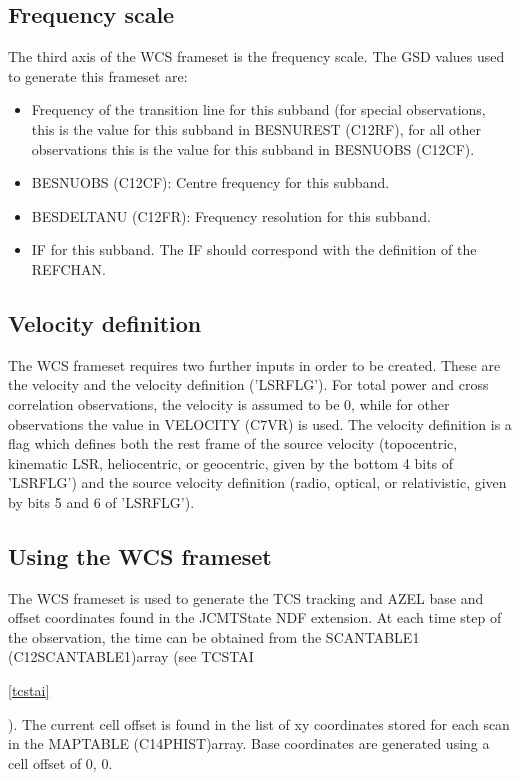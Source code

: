 \documentclass[twoside,11pt]{article}
\newcommand{\xlabel}[1]{}
\renewcommand{\_}{\texttt{\symbol{95}}}
\newcommand{\velocity}{VELOCITY (C7VR)}
\newcommand{\scanTableA}{SCAN\_TABLE1 (C12SCAN\_TABLE\_1)}
\newcommand{\mapTable}{MAP\_TABLE (C14PHIST)}
\newcommand{\centreFreqs}{BES\_NUOBS (C12CF)}
\newcommand{\restFreqs}{BES\_NUREST (C12RF)}
\newcommand{\freqRes}{BES\_DELTANU (C12FR)}
\newcommand{\velocity}{VELOCITY (C7VR)\ref{GSDVars:velocity}}
\newcommand{\scanTableA}{SCAN\_TABLE1 (C12SCAN\_TABLE\_1)\ref{GSDVars:scanTableA}}
\newcommand{\mapTable}{MAP\_TABLE (C14PHIST)\ref{GSDVars:mapTable}}
\newcommand{\centreFreqs}{BES\_NUOBS (C12CF)\ref{GSDVars:centreFreqs}}
\newcommand{\restFreqs}{BES\_NUREST (C12RF)\ref{GSDVars:restFreqs}}
\newcommand{\freqRes}{BES\_DELTANU (C12FR)\ref{GSDVars:freqRes}}
\begin{document}
\subsection{\xlabel{WCS_FREQUENCY}Frequency scale}

The third axis of the WCS frameset is the frequency scale.  The GSD values used to generate this frameset are:

\begin{itemize}
\item Frequency of the transition line for this subband (for special observations, this is the value for this subband in \restFreqs{}, for all other observations this is the value for this subband in \centreFreqs{}.
\item \centreFreqs{}: Centre frequency for this subband.
\item \freqRes{}: Frequency resolution for this subband.
\item IF for this subband.  The IF should correspond with the definition of the REFCHAN.
\end{itemize}

\subsection{\xlabel{WCS_VELOCITY}Velocity definition}

The WCS frameset requires two further inputs in order to be created.  These are the velocity and the velocity definition ('LSRFLG').  For total power and cross correlation observations, the velocity is assumed to be 0, while for other observations the value in \velocity{} is used.  The velocity definition is a flag which defines both the rest frame of the source velocity (topocentric, kinematic LSR, heliocentric, or geocentric, given by the bottom 4 bits of 'LSRFLG') and the source velocity definition (radio, optical, or relativistic, given by bits 5 and 6 of 'LSRFLG').

\subsection{\xlabel{WCS_USING}Using the WCS frameset}

The WCS frameset is used to generate the TCS tracking and AZEL base and offset coordinates found in the JCMTState NDF extension.  
At each time step of the observation, the time can be obtained from the \scanTableA array (see TCS\_TAI
\begin{htmlonly}
\ref{tcstai}
\end{htmlonly}
).  The current cell offset is found in the list of xy coordinates stored for each scan in the \mapTable array.  Base coordinates are generated using a cell offset of 0, 0.
\end{document}
